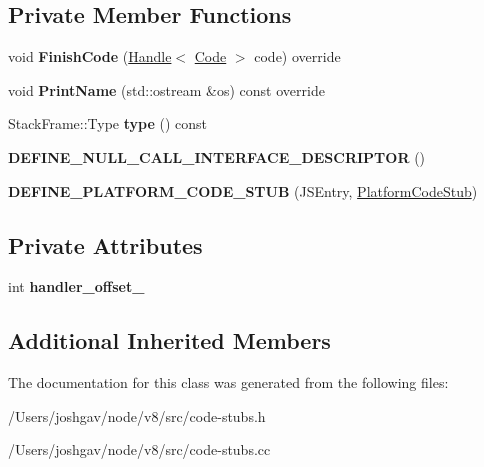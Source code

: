 \subsection*{Private Member Functions}
\begin{DoxyCompactItemize}
\item 
void {\bfseries Finish\+Code} (\hyperlink{classv8_1_1internal_1_1_handle}{Handle}$<$ \hyperlink{classv8_1_1internal_1_1_code}{Code} $>$ code) override\hypertarget{classv8_1_1internal_1_1_j_s_entry_stub_a4a9e238432fd67d0375ba102b11320e3}{}\label{classv8_1_1internal_1_1_j_s_entry_stub_a4a9e238432fd67d0375ba102b11320e3}

\item 
void {\bfseries Print\+Name} (std\+::ostream \&os) const  override\hypertarget{classv8_1_1internal_1_1_j_s_entry_stub_ab643d65ee4fa7616c2531ba4ec7ab579}{}\label{classv8_1_1internal_1_1_j_s_entry_stub_ab643d65ee4fa7616c2531ba4ec7ab579}

\item 
Stack\+Frame\+::\+Type {\bfseries type} () const \hypertarget{classv8_1_1internal_1_1_j_s_entry_stub_a496380634a3dfe08ab11d89c8610e274}{}\label{classv8_1_1internal_1_1_j_s_entry_stub_a496380634a3dfe08ab11d89c8610e274}

\item 
{\bfseries D\+E\+F\+I\+N\+E\+\_\+\+N\+U\+L\+L\+\_\+\+C\+A\+L\+L\+\_\+\+I\+N\+T\+E\+R\+F\+A\+C\+E\+\_\+\+D\+E\+S\+C\+R\+I\+P\+T\+OR} ()\hypertarget{classv8_1_1internal_1_1_j_s_entry_stub_a2c762bb935208a3c1ab1bf200471cd3a}{}\label{classv8_1_1internal_1_1_j_s_entry_stub_a2c762bb935208a3c1ab1bf200471cd3a}

\item 
{\bfseries D\+E\+F\+I\+N\+E\+\_\+\+P\+L\+A\+T\+F\+O\+R\+M\+\_\+\+C\+O\+D\+E\+\_\+\+S\+T\+UB} (J\+S\+Entry, \hyperlink{classv8_1_1internal_1_1_platform_code_stub}{Platform\+Code\+Stub})\hypertarget{classv8_1_1internal_1_1_j_s_entry_stub_a58178f8fb5918197435b0fabb478b858}{}\label{classv8_1_1internal_1_1_j_s_entry_stub_a58178f8fb5918197435b0fabb478b858}

\end{DoxyCompactItemize}
\subsection*{Private Attributes}
\begin{DoxyCompactItemize}
\item 
int {\bfseries handler\+\_\+offset\+\_\+}\hypertarget{classv8_1_1internal_1_1_j_s_entry_stub_aac56bd5491203b6e37093310621aff7c}{}\label{classv8_1_1internal_1_1_j_s_entry_stub_aac56bd5491203b6e37093310621aff7c}

\end{DoxyCompactItemize}
\subsection*{Additional Inherited Members}


The documentation for this class was generated from the following files\+:\begin{DoxyCompactItemize}
\item 
/\+Users/joshgav/node/v8/src/code-\/stubs.\+h\item 
/\+Users/joshgav/node/v8/src/code-\/stubs.\+cc\end{DoxyCompactItemize}
